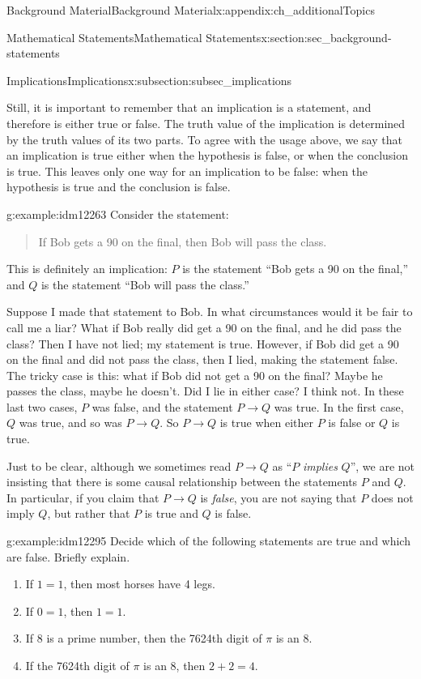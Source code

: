 \documentclass[oneside,10pt,]{book}
\numberwithin{equation}{chapter}
\def\imp{\rightarrow}
\begin{document}
\begin{appendixptx}{Background Material}{}{Background Material}{}{}{x:appendix:ch_additionalTopics}
\begin{sectionptx}{Mathematical Statements}{}{Mathematical Statements}{}{}{x:section:sec_background-statements}
\begin{subsectionptx}{Implications}{}{Implications}{}{}{x:subsection:subsec_implications}
\par
Still, it is important to remember that an implication is a statement, and therefore is either true or false. The truth value of the implication is determined by the truth values of its two parts. To agree with the usage above, we say that an implication is true either when the hypothesis is false, or when the conclusion is true. This leaves only one way for an implication to be false: when the hypothesis is true and the conclusion is false.%
\begin{example}{}{g:example:idm12263}%
Consider the statement:%
\begin{quote}%
If Bob gets a 90 on the final, then Bob will pass the class.%
\end{quote}
This is definitely an implication: \(P\) is the statement ``Bob gets a 90 on the final,'' and \(Q\) is the statement ``Bob will pass the class.''%
\par
Suppose I made that statement to Bob. In what circumstances would it be fair to call me a liar? What if Bob really did get a 90 on the final, and he did pass the class? Then I have not lied; my statement is true. However, if Bob did get a 90 on the final and did not pass the class, then I lied, making the statement false. The tricky case is this: what if Bob did not get a 90 on the final? Maybe he passes the class, maybe he doesn't. Did I lie in either case? I think not. In these last two cases, \(P\) was false, and the statement \(P \imp Q\) was true. In the first case, \(Q\) was true, and so was \(P \imp Q\). So \(P \imp Q\) is true when either \(P\) is false or \(Q\) is true.%
\end{example}
Just to be clear, although we sometimes read \(P \imp Q\) as ``\(P\) \emph{implies} \(Q\)'', we are not insisting that there is some causal relationship between the statements \(P\) and \(Q\). In particular, if you claim that \(P \imp Q\) is \emph{false}, you are not saying that \(P\) does not imply \(Q\), but rather that \(P\) is true and \(Q\) is false.%
\begin{example}{}{g:example:idm12295}%
Decide which of the following statements are true and which are false. Briefly explain.%
\begin{enumerate}
\item{}If \(1=1\), then most horses have 4 legs.%
\item{}If \(0=1\), then \(1=1\).%
\item{}If 8 is a prime number, then the 7624th digit of \(\pi\) is an 8.%
\item{}If the 7624th digit of \(\pi\) is an 8, then \(2+2 = 4\).%

\end{enumerate}
\end{example}
\end{subsectionptx}
\end{sectionptx}
\end{appendixptx}
\end{document}
